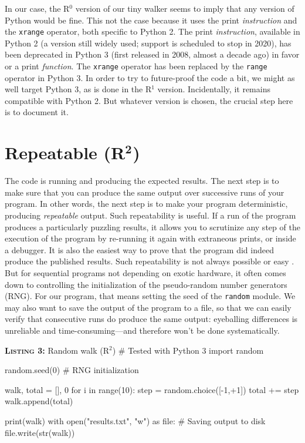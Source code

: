 \documentclass[a4paper,11pt]{article}
\begin{document}
In our case, the R$^0$ version of our tiny walker seems to imply that any
version of Python would be fine.  This not the case because it uses the print
{\em instruction} and the {\tt xrange} operator, both specific to Python 2.
The print {\em instruction}, available in Python 2 (a version still widely
used; support is scheduled to stop in 2020), has been deprecated in Python 3
(first released in 2008, almost a decade ago) in favor or a print {\em
  function}.  The {\tt xrange} operator has been replaced by the {\tt range}
operator in Python 3.  In order to try to future-proof the code a bit, we might
as well target Python 3, as is done in the R$^1$ version.  Incidentally, it
remains compatible with Python 2. But whatever version is chosen, the crucial
step here is to document it.


\section*{Repeatable (R$^{\mathbf 2}$)}

The code is running and producing the expected results.  The next step is to
make sure that you can produce the same output over successive runs of your
program.  In other words, the next step is to make your program deterministic,
producing {\em repeatable} output.  Such repeatability is useful.  If a run of
the program produces a particularly puzzling results, it allows you to
scrutinize any step of the execution of the program by re-running it again with
extraneous prints, or inside a debugger.  It is also the easiest way to prove
that the program did indeed produce the published results.  Such repeatability
is not always possible or easy \citep{Diethelm:2012, Courtes:2015}.  But for
sequential programs not depending on exotic hardware, it often comes down to
controlling the initialization of the pseudo-random number generators (RNG).
For our program, that means setting the seed of the {\tt random} module. We may
also want to save the output of the program to a file, so that we can easily
verify that consecutive runs do produce the same output: eyeballing differences
is unreliable and time-consuming---and therefore won't be done systematically.

\begin{code}{\textbf{\textsc{Listing 3:}} Random walk (R$^2$)}
# Tested with Python 3
import random

random.seed(0) # RNG initialization

walk, total = [], 0
for i in range(10):
    step = random.choice([-1,+1])     
    total += step
    walk.append(total)
    
print(walk)
with open("results.txt", "w") as file: # Saving output to disk
    file.write(str(walk))
\end{code}
\end{document}

